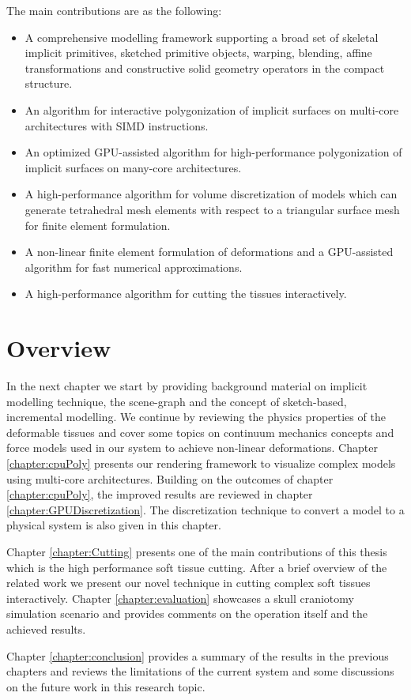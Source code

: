 The main contributions are as the following:

\begin{itemize}
 \item A comprehensive modelling framework supporting a broad set of skeletal implicit primitives, sketched primitive objects, warping, blending, 
 affine transformations and constructive solid geometry operators in the compact \blob structure.
 \item An algorithm for interactive polygonization of implicit surfaces on multi-core architectures with SIMD instructions.
 \item An optimized GPU-assisted algorithm for high-performance polygonization of implicit surfaces on many-core architectures.
 \item A high-performance algorithm for volume discretization of \blob models which can generate tetrahedral mesh elements with respect to a triangular 
 surface mesh for finite element formulation.
 \item A non-linear finite element formulation of deformations and a GPU-assisted algorithm for fast numerical approximations.
 \item A high-performance algorithm for cutting the tissues interactively. 
\end{itemize}


\section{Overview}
In the next chapter we start by providing background material on implicit modelling technique, the \blob scene-graph and the concept of sketch-based, incremental modelling.
We continue by reviewing the physics properties of the deformable tissues and cover some topics on continuum mechanics concepts and force models used in
our system to achieve non-linear deformations. Chapter \ref{chapter:cpuPoly} presents our rendering framework to visualize complex \blob models using multi-core 
architectures. Building on the outcomes of chapter \ref{chapter:cpuPoly}, the improved results are reviewed in chapter \ref{chapter:GPUDiscretization}. 
The discretization technique to convert a \blob model to a physical system is also given in this chapter. 

Chapter \ref{chapter:Cutting} presents one of the main contributions of this thesis which is the high performance soft tissue cutting. After a brief overview of the 
related work we present our novel technique in cutting complex soft tissues interactively. Chapter \ref{chapter:evaluation} showcases a skull craniotomy simulation 
scenario and provides comments on the operation itself and the achieved results.

Chapter \ref{chapter:conclusion} provides a summary of the results in the previous chapters and reviews the limitations of the current system
and some discussions on the future work in this research topic.

















